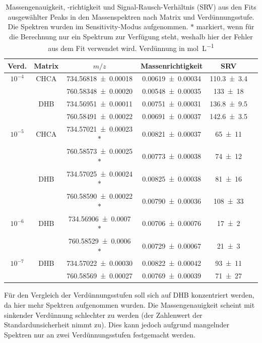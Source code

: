 \begin{table}[H]
	\centering
	\caption{Massengenauigkeit, -richtigkeit und Signal-Rausch-Verhältnis (SRV) aus den Fits ausgewählter Peaks in den Massenspektren nach Matrix und Verdünnungsstufe. Die Spektren wurden im Sensitivity-Modus aufgenommen. $*$ markiert, wenn für die Berechnung nur ein Spektrum zur Verfügung steht, weshalb hier der Fehler aus dem Fit verwendet wird. Verdünnung in \si{\mole \per \liter}}
	   \begin{tabular}{c | c | c | c  | c | c}
      Verd. & Matrix & $m/z$ & Massenrichtigkeit & SRV \\ \hline
      $10^{-4}$ & CHCA & \SI{734,56818 \pm 0,00018}{} & \SI{0,00619 \pm 0,00034}{} & \SI{110,3 \pm 3,4}{}\\
                &      & \SI{760,58348 \pm 0,00020}{} & \SI{0,00548 \pm 0,00035}{} & \SI{133 \pm 18}{}\\
                & DHB  & \SI{734,56951 \pm 0,00011}{} & \SI{0,00751 \pm 0,00031}{} & \SI{136,8 \pm 9,5}{}\\
                &      & \SI{760,58491 \pm 0,00022}{} & \SI{0,00691 \pm 0,00037}{} & \SI{142,6 \pm 3,5}{}\\
      $10^{-5}$ & CHCA & \SI{734,57021 \pm 0,00023}{} $*$ & \SI{0,00821 \pm 0,00037}{} & \SI{65 \pm 11}{}\\
                &      & \SI{760,58573 \pm 0,00025}{} $*$ & \SI{0,00773 \pm 0,00038}{} & \SI{74 \pm 12}{} \\
                &  DHB & \SI{734,57025 \pm 0,00024}{} $*$ & \SI{0,00825 \pm 0,00038}{} & \SI{81 \pm 16}{}\\
                &      & \SI{760,58590 \pm 0,00022}{} $*$ & \SI{0,00790 \pm 0,00036}{} & \SI{108 \pm 33}{}\\
      $10^{-6}$ & DHB  & \SI{734,56906 \pm 0,0007 }{} $*$ & \SI{0,00706 \pm 0,00076}{} & \SI{17 \pm 2}{}\\
                &      & \SI{760,58529 \pm 0,0006 }{} $*$ & \SI{0,00729 \pm 0,00067}{} & \SI{21 \pm 3}{}\\
      $10^{-7}$ & DHB  & \SI{734,57022 \pm 0,00030}{} & \SI{0,00822 \pm 0,00042}{} & \SI{93 \pm 11}{}\\
                &      & \SI{760,58569 \pm 0,00027}{} & \SI{0,00769 \pm 0,00039}{} & \SI{71 \pm 27}{}\\
	\end{tabular}
	\label{tab:verduennungen}
\end{table}

Für den Vergleich der Verdünnungsstufen soll sich auf DHB konzentriert werden, da hier mehr Spektren aufgenommen wurden.
Die Massengenauigkeit scheint mit sinkender Verdünnung schlechter zu werden (der Zahlenwert der Standardunsicherheit nimmt zu).
Dies kann jedoch aufgrund mangelnder Spektren nur an zwei Verdünnungsstufen festgemacht werden.

